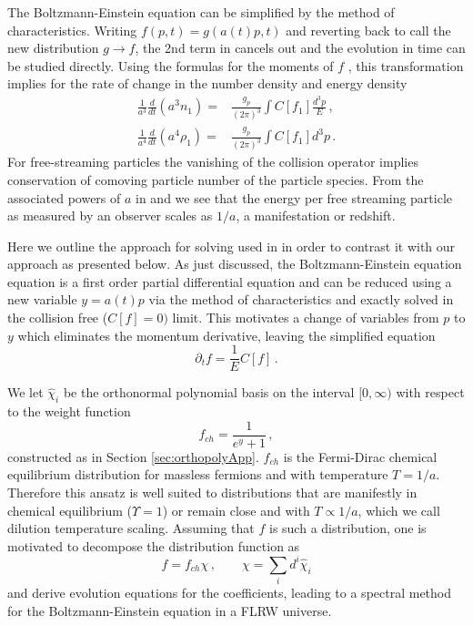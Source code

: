 The Boltzmann-Einstein equation  can be simplified by the method of characteristics. Writing $f(p, t)=g(a(t)p,t)$ and reverting back to call the new distribution $g\to f$, the 2nd term in  cancels out and the evolution in time can be studied directly.  Using the formulas for the moments of $f$ , this transformation implies for the rate of change in the   number density and energy density  
\begin{align}\label{n:div}
\frac{1}{a^3}\frac{d}{dt}(a^3n_1)=&\frac{g_p}{(2\pi)^3}\int C[f_1] \frac{d^3p}{E}\,,\\
\label{rho:div}
\frac{1}{a^4}\frac{d}{dt}(a^4\rho_1)=&\frac{g_p}{(2\pi)^3}\int C[f_1] d^3p \,.
\end{align} 
For free-streaming particles the vanishing of the collision operator implies conservation of comoving particle number of the particle species. From the associated powers of $a$ in  and  we see that the energy per free streaming particle as measured by an observer scales as $1/a$, a manifestation or redshift.


Here we outline the approach for solving  used in \cite{Esposito:2000hi,Mangano:2001iu} in order to contrast it with our approach as presented below.  As just discussed, the Boltzmann-Einstein equation equation  is a first order partial differential equation and can be reduced using a new variable $y=a(t)p$  via the method of characteristics and exactly solved in the collision free ($C[f]=0)$ limit.   This motivates a change of variables from $p$ to $y$ which eliminates the momentum derivative, leaving the simplified equation
\begin{equation}\label{aVars}
\partial_tf=\frac{1}{E} C[f]\,.
\end{equation}

We let $\hat\chi_i$ be the orthonormal polynomial basis on the interval $[0,\infty)$ with respect to the weight function
\begin{equation}\label{freeStreamWeight}
f_{ch}=\frac{1}{e^y+1}\,,
\end{equation}
constructed as in Section \ref{sec:orthopolyApp}. $f_{ch}$ is the Fermi-Dirac chemical equilibrium distribution for massless fermions and with temperature $T=1/a$.  Therefore this ansatz is well suited to distributions that are manifestly in chemical equilibrium ($\Upsilon=1$) or remain close and with $T\propto 1/a$, which we call dilution temperature scaling.  Assuming that $f$ is such a distribution, one is   motivated to decompose the distribution function as
\begin{equation}\label{freeStreamAnsatz}
f=f_{ch}\chi\,,\qquad \chi=\sum_i d^i\hat\chi_i
\end{equation}
and derive evolution equations for the coefficients, leading to a spectral method for the Boltzmann-Einstein equation in a FLRW universe.

